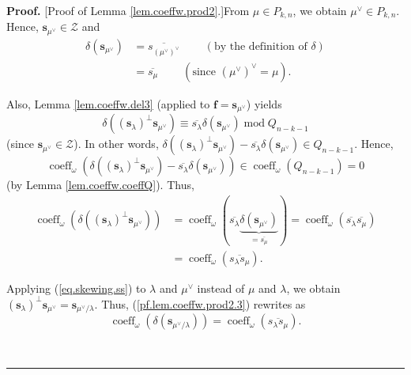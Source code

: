 \documentclass[numbers=enddot,12pt,final,onecolumn,notitlepage]{scrartcl}%
\theoremstyle{definition}
\newenvironment{proof}[1][Proof]{\noindent\textbf{#1.} }{\ \rule{0.5em}{0.5em}}
\begin{document}
\begin{proof}
[Proof of Lemma \ref{lem.coeffw.prod2}.]From $\mu\in P_{k,n}$, we obtain
$\mu^{\vee}\in P_{k,n}$. Hence, $\mathbf{s}_{\mu^{\vee}}\in\mathcal{Z}$ and
\begin{align*}
\delta\left(  \mathbf{s}_{\mu^{\vee}}\right)   &  =\overline{s_{\left(
\mu^{\vee}\right)  ^{\vee}}}\ \ \ \ \ \ \ \ \ \ \left(  \text{by the
definition of }\delta\right) \\
&  =\overline{s_{\mu}}\ \ \ \ \ \ \ \ \ \ \left(  \text{since }\left(
\mu^{\vee}\right)  ^{\vee}=\mu\right)  .
\end{align*}


Also, Lemma \ref{lem.coeffw.del3} (applied to $\mathbf{f}=\mathbf{s}%
_{\mu^{\vee}}$) yields%
\[
\delta\left(  \left(  \mathbf{s}_{\lambda}\right)  ^{\perp}\mathbf{s}%
_{\mu^{\vee}}\right)  \equiv\overline{s_{\lambda}}\delta\left(  \mathbf{s}%
_{\mu^{\vee}}\right)  \operatorname{mod}Q_{n-k-1}%
\]
(since $\mathbf{s}_{\mu^{\vee}}\in\mathcal{Z}$). In other words,
$\delta\left(  \left(  \mathbf{s}_{\lambda}\right)  ^{\perp}\mathbf{s}%
_{\mu^{\vee}}\right)  -\overline{s_{\lambda}}\delta\left(  \mathbf{s}%
_{\mu^{\vee}}\right)  \in Q_{n-k-1}$. Hence,%
\[
\operatorname*{coeff}\nolimits_{\omega}\left(  \delta\left(  \left(
\mathbf{s}_{\lambda}\right)  ^{\perp}\mathbf{s}_{\mu^{\vee}}\right)
-\overline{s_{\lambda}}\delta\left(  \mathbf{s}_{\mu^{\vee}}\right)  \right)
\in\operatorname*{coeff}\nolimits_{\omega}\left(  Q_{n-k-1}\right)  =0
\]
(by Lemma \ref{lem.coeffw.coeffQ}). Thus,
\begin{align}
\operatorname*{coeff}\nolimits_{\omega}\left(  \delta\left(  \left(
\mathbf{s}_{\lambda}\right)  ^{\perp}\mathbf{s}_{\mu^{\vee}}\right)  \right)
&  =\operatorname*{coeff}\nolimits_{\omega}\left(  \overline{s_{\lambda}%
}\underbrace{\delta\left(  \mathbf{s}_{\mu^{\vee}}\right)  }_{=\overline
{s_{\mu}}}\right)  =\operatorname*{coeff}\nolimits_{\omega}\left(
\overline{s_{\lambda}}\overline{s_{\mu}}\right) \nonumber\\
&  =\operatorname*{coeff}\nolimits_{\omega}\left(  \overline{s_{\lambda}%
s_{\mu}}\right)  . \label{pf.lem.coeffw.prod2.3}%
\end{align}


Applying (\ref{eq.skewing.ss}) to $\lambda$ and $\mu^{\vee}$ instead of $\mu$
and $\lambda$, we obtain $\left(  \mathbf{s}_{\lambda}\right)  ^{\perp
}\mathbf{s}_{\mu^{\vee}}=\mathbf{s}_{\mu^{\vee}/\lambda}$. Thus,
(\ref{pf.lem.coeffw.prod2.3}) rewrites as%
\begin{equation}
\operatorname*{coeff}\nolimits_{\omega}\left(  \delta\left(  \mathbf{s}%
_{\mu^{\vee}/\lambda}\right)  \right)  =\operatorname*{coeff}\nolimits_{\omega
}\left(  \overline{s_{\lambda}s_{\mu}}\right)  . \label{pf.lem.coeffw.prod2.4}%
\end{equation}



\end{proof}
\end{document}
